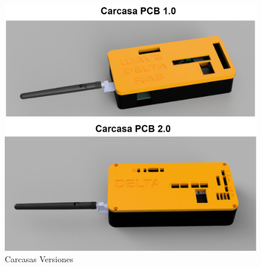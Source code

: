 \begin{figure}[H]
    \centering
    \includegraphics[width=(\textwidth-2)]{Imagenes/Anexos/carcasa_version.png}
    \caption{Carcasas Versiones }
    \label{fig:carcasasVersion}
\end{figure}

